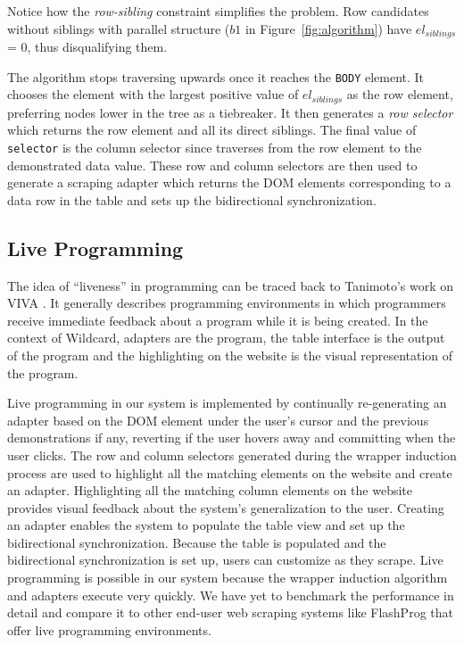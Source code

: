 \documentclass[sigconf,10pt]{acmart}
\begin{document}
Notice how the \emph{row-sibling} constraint simplifies the problem. Row
candidates without siblings with parallel structure (\(b1\) in
Figure~\ref{fig:algorithm}) have \(el_{siblings}\) = 0, thus
disqualifying them.

The algorithm stops traversing upwards once it reaches the \texttt{BODY}
element. It chooses the element with the largest positive value of
\(el_{siblings}\) as the row element, preferring nodes lower in the tree
as a tiebreaker. It then generates a \emph{row selector} which returns
the row element and all its direct siblings. The final value of
\texttt{selector} is the column selector since traverses from the row
element to the demonstrated data value. These row and column selectors
are then used to generate a scraping adapter which returns the DOM
elements corresponding to a data row in the table and sets up the
bidirectional synchronization.

\hypertarget{live-programming}{%
\subsection{Live Programming}\label{live-programming}}

The idea of ``liveness'' in programming can be traced back to Tanimoto's
work on VIVA \citep{tanimoto1990}. It generally describes programming
environments in which programmers receive immediate feedback about a
program while it is being created. In the context of Wildcard, adapters
are the program, the table interface is the output of the program and
the highlighting on the website is the visual representation of the
program.

Live programming in our system is implemented by continually
re-generating an adapter based on the DOM element under the user's
cursor and the previous demonstrations if any, reverting if the user
hovers away and committing when the user clicks. The row and column
selectors generated during the wrapper induction process are used to
highlight all the matching elements on the website and create an
adapter. Highlighting all the matching column elements on the website
provides visual feedback about the system's generalization to the user.
Creating an adapter enables the system to populate the table view and
set up the bidirectional synchronization. Because the table is populated
and the bidirectional synchronization is set up, users can customize as
they scrape. Live programming is possible in our system because the
wrapper induction algorithm and adapters execute very quickly. We have
yet to benchmark the performance in detail and compare it to other
end-user web scraping systems like FlashProg \citep{mayer2015} that
offer live programming environments.
\end{document}
